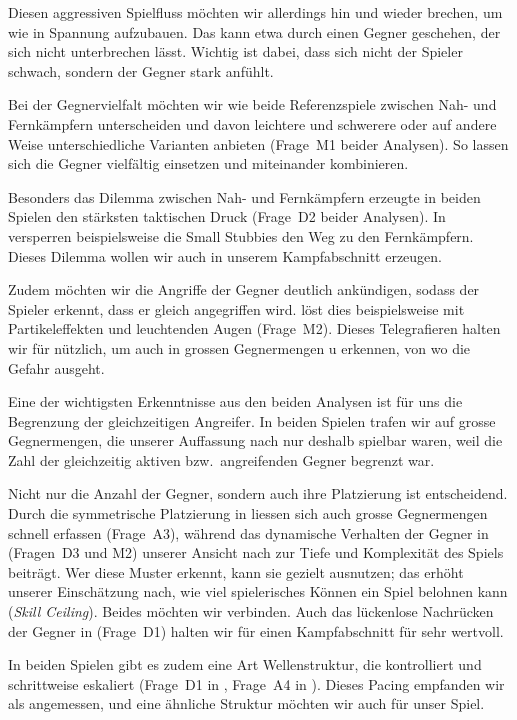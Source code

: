 \documentclass[../Main.tex]{subfiles}
\begin{document}
Diesen aggressiven Spielfluss möchten wir allerdings hin und wieder brechen, um wie in  Spannung aufzubauen. Das kann etwa durch einen Gegner geschehen, der sich nicht unterbrechen lässt. Wichtig ist dabei, dass sich nicht der Spieler schwach, sondern der Gegner stark anfühlt.

Bei der Gegnervielfalt möchten wir wie beide Referenzspiele zwischen Nah- und Fernkämpfern unterscheiden und davon leichtere und schwerere oder auf andere Weise unterschiedliche Varianten anbieten (Frage~M1 beider Analysen). So lassen sich die Gegner vielfältig einsetzen und miteinander kombinieren.

Besonders das Dilemma zwischen Nah- und Fernkämpfern erzeugte in beiden Spielen den stärksten taktischen Druck (Frage~D2 beider Analysen). In  versperren beispielsweise die Small Stubbies den Weg zu den Fernkämpfern. Dieses Dilemma wollen wir auch in unserem Kampfabschnitt erzeugen.

Zudem möchten wir die Angriffe der Gegner deutlich ankündigen, sodass der Spieler erkennt, dass er gleich angegriffen wird.  löst dies beispielsweise mit Partikeleffekten und leuchtenden Augen (Frage~M2). Dieses Telegrafieren halten wir für nützlich, um auch in grossen Gegnermengen u erkennen, von wo die Gefahr ausgeht.

Eine der wichtigsten Erkenntnisse aus den beiden Analysen ist für uns die Begrenzung der gleichzeitigen Angreifer. In beiden Spielen trafen wir auf grosse Gegnermengen, die unserer Auffassung nach nur deshalb spielbar waren, weil die Zahl der gleichzeitig aktiven bzw.\ angreifenden Gegner begrenzt war.

Nicht nur die Anzahl der Gegner, sondern auch ihre Platzierung ist entscheidend. Durch die symmetrische Platzierung in  liessen sich auch grosse Gegnermengen schnell erfassen (Frage~A3), während das dynamische Verhalten der Gegner in  (Fragen~D3 und M2) unserer Ansicht nach zur Tiefe und Komplexität des Spiels beiträgt. Wer diese Muster erkennt, kann sie gezielt ausnutzen; das erhöht unserer Einschätzung nach, wie viel spielerisches Können ein Spiel belohnen kann (\textit{Skill Ceiling}). Beides möchten wir verbinden. Auch das lückenlose Nachrücken der Gegner in  (Frage~D1) halten wir für einen Kampfabschnitt für sehr wertvoll.

In beiden Spielen gibt es zudem eine Art Wellenstruktur, die kontrolliert und schrittweise eskaliert (Frage~D1 in , Frage~A4 in ). Dieses Pacing empfanden wir als angemessen, und eine ähnliche Struktur möchten wir auch für unser Spiel.
\end{document}
